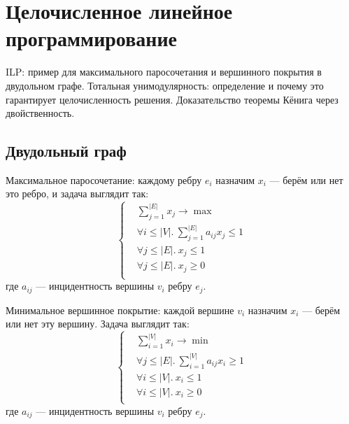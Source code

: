 \section{Целочисленное линейное программирование}
ILP: пример для максимального паросочетания
и вершинного покрытия в двудольном графе.
Тотальная унимодулярность:
определение и почему это гарантирует целочисленность решения.
Доказательство теоремы Кёнига через двойственность.

\subsection{Двудольный граф}
Максимальное паросочетание:
каждому ребру $e_i$ назначим $x_i$
--- берём или нет это ребро,
и задача выглядит так:
\[
    \left\{
        \begin{aligned}
            & \sum_{j=1}^{|E|} x_j \to \max \\
            & \forall i \le |V|.~\sum_{j=1}^{|E|} a_{ij} x_j \le 1 \\
            & \forall j \le |E|.~x_j \le 1 \\
            & \forall j \le |E|.~x_j \ge 0 \\
        \end{aligned}
    \right.
\]
где $a_{ij}$ --- инцидентность вершины $v_i$ ребру $e_j$.

Минимальное вершинное покрытие:
каждой вершине $v_i$ назначим $x_i$
--- берём или нет эту вершину.
Задача выглядит так:
\[
    \left\{
        \begin{aligned}
            & \sum_{i=1}^{|V|} x_i \to \min \\
            & \forall j \le |E|.~\sum_{i=1}^{|V|} a_{ij} x_i \ge 1 \\
            & \forall i \le |V|.~x_i \le 1 \\
            & \forall i \le |V|.~x_i \ge 0 \\
        \end{aligned}
    \right.
\]
где $a_{ij}$ --- инцидентность вершины $v_i$ ребру $e_j$.
